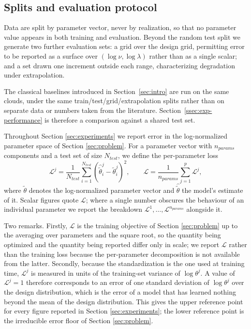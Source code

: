\documentclass[11pt,letterpaper]{article}
\newcommand{\1}{\mathds{1}}
\theoremstyle{plain}
\theoremstyle{definitioncolon}
\begin{document}
\subsection{Splits and evaluation protocol}
\label{ssec:eval-protocol}

Data are split by parameter vector, never by realization, so that no parameter
value appears in both training and evaluation. Beyond the random test split we
generate two further evaluation sets: a grid over the design grid, permitting
error to be reported as a surface over $(\log\nu, \log\lambda)$ rather than as a
single scalar; and a set drawn one increment outside each range, characterizing
degradation under extrapolation.

The classical baselines introduced in Section~\ref{sec:intro} are run on the same clouds,
under the same train/test/grid/extrapolation splits rather than on separate data
or numbers taken from the literature. Section~\ref{ssec:exp-performance}
is therefore a comparison
against a shared  test set.

Throughout Section \ref{sec:experiments} we report error in the log-normalized
parameter space of Section \ref{sec:problem}. For a parameter vector with $n_{params}$
components and a test set of size $N_{test}$, we define the per-parameter loss
    \[
    \mathcal{L}^j = \frac{1}{N_{test}} \sum_{i=1}^{N_{test}}
    (\hat{\tilde\theta}^j_i - \tilde\theta^j_i)^2,
    \qquad
    \mathcal{L} = \frac{1}{n_{params}} \sum_{j=1}^{p} \mathcal{L}^j,
    \]
where $\tilde\theta$ denotes the log-normalized parameter vector and
$\hat{\tilde\theta}$ the model's estimate of it. Scalar figures quote
$\mathcal{L}$; where a single number obscures the behaviour of an individual
parameter we report the breakdown $\mathcal{L}^1, \dots, \mathcal{L}^{n_{params}}$
alongside it.

Two remarks. Firstly, $\mathcal{L}$ is the training objective of Section
\ref{sec:problem} up to the averaging over parameters and the square root, so
the quantity being optimized and the quantity being reported differ only in
scale; we report $\mathcal{L}$ rather than the training loss because the
per-parameter decomposition is not available from the latter. Secondly, because
the standardization is the one used at training time, $\mathcal{L}^j$ is
measured in units of the training-set variance of $\log\theta^j$. A value of
$\mathcal{L}^j = 1$ therefore corresponds to an error of one standard deviation
of $\log\theta^j$ over the design distribution, which is the error of a model
that has learned nothing beyond the mean of the design distribution. This gives
the upper reference point for every figure reported in Section
\ref{sec:experiments}; the lower reference point is the irreducible error floor
of Section \ref{sec:problem}.
\end{document}
